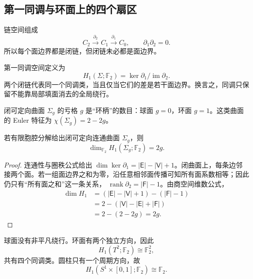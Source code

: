 \subsection{第一同调与环面上的四个扇区}
\label{sec:phys-sm-homology}

链空间组成
\[
C_2\xrightarrow{\partial_2}C_1\xrightarrow{\partial_1}C_0,
\qquad \partial_1\partial_2=0.
\]
所以每个面边界都是闭链，但闭链未必都是面边界。

\begin{definition}[第一同调]
第一同调空间定义为
\begin{equation}
H_1(\Sigma;\mathbb F_2)
=\ker\partial_1/\operatorname{im}\partial_2.
\label{eq:phys-sm-first-homology}
\end{equation}
两个闭链代表同一个同调类，当且仅当它们的差是若干面边界。换言之，同调只保留不能靠局部填面消去的全局绕行。
\end{definition}

闭可定向曲面 \(\Sigma_g\) 的亏格 \(g\) 是“环柄”的数目：球面 \(g=0\)，环面 \(g=1\)。这类曲面的 Euler 特征为
\(\chi(\Sigma_g)=2-2g\)。

\begin{theorem}[闭可定向曲面的一阶模二同调]
若有限胞腔分解给出闭可定向连通曲面 \(\Sigma_g\)，则
\begin{equation}
\dim_{\mathbb F_2}H_1(\Sigma_g;\mathbb F_2)=2g.
\label{eq:phys-sm-genus-h1-dimension}
\end{equation}
\end{theorem}

\begin{proof}
连通性与圈秩公式给出
\(\dim\ker\partial_1=|\mathsf E|-|\mathsf V|+1\)。闭曲面上，每条边邻接两个面。若一组面边界之和为零，沿任意相邻面传播可知所有面系数相等；因此仍只有“所有面之和”这一条关系，
\(\operatorname{rank}\partial_2=|\mathsf F|-1\)。由商空间维数公式，
\[
\begin{aligned}
\dim H_1
&=(|\mathsf E|-|\mathsf V|+1)-(|\mathsf F|-1)\\
&=2-(|\mathsf V|-|\mathsf E|+|\mathsf F|)\\
&=2-(2-2g)=2g.
\end{aligned}
\]
\end{proof}

球面没有非平凡绕行。环面有两个独立方向，因此
\begin{equation}
H_1(T^2;\mathbb F_2)\cong\mathbb F_2^2,
\label{eq:phys-sm-torus-h1}
\end{equation}
共有四个同调类。圆柱只有一个周期方向，故
\begin{equation}
H_1(S^1\times[0,1];\mathbb F_2)\cong\mathbb F_2.
\label{eq:phys-sm-cylinder-h1}
\end{equation}

